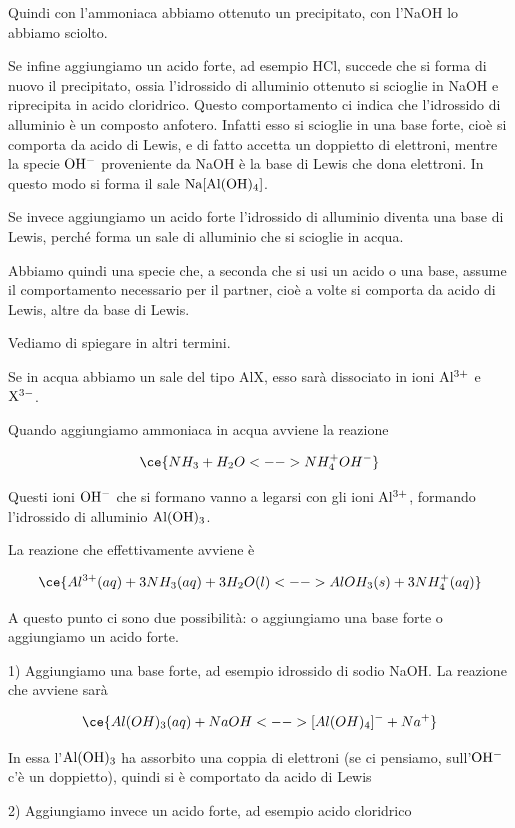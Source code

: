 Quindi con l'ammoniaca abbiamo ottenuto un precipitato, con l'NaOH lo abbiamo sciolto.

Se infine aggiungiamo un acido forte, ad esempio HCl, succede che si forma di nuovo il precipitato, ossia l'idrossido di alluminio ottenuto si scioglie in NaOH e riprecipita in acido cloridrico. Questo comportamento ci indica che l'idrossido di alluminio è un composto anfotero. Infatti esso si scioglie in una base forte, cioè si comporta da acido di Lewis, e di fatto accetta un doppietto di elettroni, mentre la specie $\rm OH^-$ proveniente da NaOH è la base di Lewis che dona elettroni. In questo modo si forma il sale $\rm Na[Al(OH)_4]$.

Se invece aggiungiamo un acido forte l'idrossido di alluminio diventa una base di Lewis, perché forma un sale di alluminio che si scioglie in acqua.

Abbiamo quindi una specie che, a seconda che si usi un acido o una base, assume il comportamento necessario per il partner, cioè a volte si comporta da acido di Lewis, altre da base di Lewis.

\vspace{0.2cm}Vediamo di spiegare in altri termini.

Se in acqua abbiamo un sale del tipo AlX, esso sarà dissociato in ioni $\rm Al^{3+}$ e $\rm X^{3-}$.

Quando aggiungiamo ammoniaca in acqua avviene la reazione

$$\ce{NH_3 + H_2O <--> NH_4^+ OH^-}$$

Questi ioni $\rm OH^-$ che si formano vanno a legarsi con gli ioni $\rm Al^{3+}$, formando l'idrossido di alluminio $\rm Al(OH)_3$.

La reazione che effettivamente avviene è

$$\ce{Al^{3+}(aq) + 3NH_3(aq) + 3H_2O(l) <--> AlOH_3(s) + 3NH_4^+(aq)}$$

A questo punto ci sono due possibilità: o aggiungiamo una base forte o aggiungiamo un acido forte.

\vspace{0.2cm}1) Aggiungiamo una base forte, ad esempio idrossido di sodio NaOH. La reazione che avviene sarà

$$\ce{Al(OH)_3(aq) + NaOH <--> [Al(OH)_4]^- + Na^+}$$

In essa l'$\rm Al(OH)_3$ ha assorbito una coppia di elettroni (se ci pensiamo, sull'$\rm OH^-$ c'è un doppietto), quindi si è comportato da acido di Lewis

\vspace{0.2cm}2) Aggiungiamo invece un acido forte, ad esempio acido cloridrico

